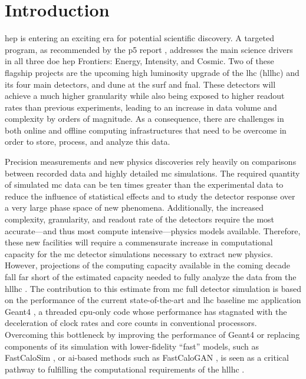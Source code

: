 \section{Introduction}

\ac{hep} is entering an exciting era for potential scientific discovery. A
targeted program, as recommended by the \ac{p5} report
\cite{ritz_building_2014}, addresses the main science drivers in all three
\ac{doe} \ac{hep} Frontiers: Energy, Intensity, and Cosmic. Two of these
flagship projects are the upcoming high luminosity upgrade of the \acl{lhc}
(\acs{hllhc}) and its four main detectors, and \ac{dune} at the \ac{surf} and
\ac{fnal}. These detectors will achieve a much higher granularity while also
being exposed to higher readout rates than previous experiments, leading to an
increase in data volume and complexity by orders of magnitude. As a consequence,
there are challenges in both online and offline computing infrastructures that
need to be overcome in order to store, process, and analyze this data.

Precision measurements and new physics discoveries rely heavily on comparisons
between recorded data and highly detailed \ac{mc} simulations. The required
quantity of simulated \ac{mc} data can be ten times greater than the
experimental data to reduce the influence of statistical effects and to study
the detector response over a very large phase space of new phenomena.
Additionally, the increased complexity, granularity, and readout rate of the
detectors require the most accurate---and thus most compute intensive---physics
models available. Therefore, these new facilities will require a commensurate
increase in computational capacity for the \ac{mc} detector simulations
necessary to extract new physics. However, projections of the computing capacity
available in the coming decade fall far short of the estimated capacity needed
to fully analyze the data from the \acs{hllhc}
\cite{the_atlas_collaboration_atlas_2020,cms-offline-computing-results}. The
contribution to this estimate from \ac{mc} full detector simulation is based on
the performance of the current state-of-the-art and \acs{lhc} baseline \ac{mc}
application Geant4 \cite{geant4,geant4_2006,geant4_status_2016}, a threaded
\acs{cpu}-only code whose performance has stagnated with the deceleration of
clock rates and core counts in conventional processors. Overcoming this
bottleneck by improving the performance of Geant4 or replacing components of its
simulation with lower-fidelity ``fast'' models, such as FastCaloSim
\cite{fastcalosim}, or \ac{ai}-based methods such as FastCaloGAN
\cite{fastcalogan}, is seen as a critical pathway to fulfilling the
computational requirements of the \acs{hllhc}
\cite{the_hep_software_foundation_roadmap_2019}.

